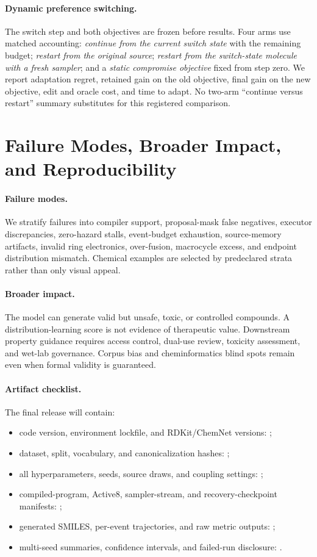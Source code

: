 \documentclass{article}
\theoremstyle{definition}
\theoremstyle{remark}
\begin{document}
\paragraph{Dynamic preference switching.}
The switch step and both objectives are frozen before results. Four arms use matched accounting: \emph{continue from the current switch state} with the remaining budget; \emph{restart from the original source}; \emph{restart from the switch-state molecule with a fresh sampler}; and a \emph{static compromise objective} fixed from step zero. We report adaptation regret, retained gain on the old objective, final gain on the new objective, edit and oracle cost, and time to adapt. No two-arm ``continue versus restart'' summary substitutes for this registered comparison.

\section{Failure Modes, Broader Impact, and Reproducibility}

\paragraph{Failure modes.}
We stratify failures into compiler support, proposal-mask false negatives, executor discrepancies, zero-hazard stalls, event-budget exhaustion, source-memory artifacts, invalid ring electronics, over-fusion, macrocycle excess, and endpoint distribution mismatch. Chemical examples are selected by predeclared strata rather than only visual appeal.

\paragraph{Broader impact.}
The model can generate valid but unsafe, toxic, or controlled compounds. A distribution-learning score is not evidence of therapeutic value. Downstream property guidance requires access control, dual-use review, toxicity assessment, and wet-lab governance. Corpus bias and cheminformatics blind spots remain even when formal validity is guaranteed.

\paragraph{Artifact checklist.}
The final release will contain:
\begin{itemize}[leftmargin=*]
    \item code version, environment lockfile, and RDKit/ChemNet versions: \XXX;
    \item dataset, split, vocabulary, and canonicalization hashes: \XXX;
    \item all hyperparameters, seeds, source draws, and coupling settings: \XXX;
    \item compiled-program, Active8, sampler-stream, and recovery-checkpoint manifests: \XXX;
    \item generated SMILES, per-event trajectories, and raw metric outputs: \XXX;
    \item multi-seed summaries, confidence intervals, and failed-run disclosure: \XXX.
\end{itemize}
\end{document}

